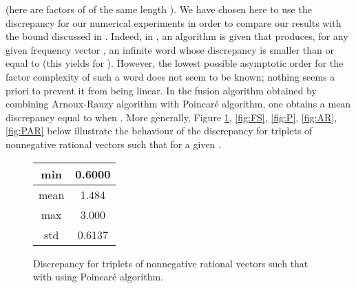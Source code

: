 \documentclass[preliminary,copyright,creativecommons]{eptcs}
\begin{document}
(here  are     factors   of  of the same length ).  We have chosen here to use the discrepancy for our  numerical experiments in order
to compare our results with the  bound  discussed  in  \cite{tij}.
Indeed, in   \cite{tij},   an  algorithm   is given that produces, for any given  frequency vector ,   an infinite word   whose
 discrepancy   is smaller than or equal to  (this yields  for ). However,   the  lowest possible   asymptotic order  for the  factor complexity of   such a  word     does not seem to be   known; nothing seems  a priori to prevent it  from  being linear.  In the fusion algorithm obtained  by combining Arnoux-Rauzy algorithm with Poincar\'e algorithm,
 one obtains   a mean  discrepancy   equal to  when . More generally, Figure  \ref{fig:P20}, \ref{fig:FS},  \ref{fig:P}, \ref{fig:AR}, \ref{fig:PAR} below  illustrate  the behaviour  of the discrepancy 
for   triplets of nonnegative rational  vectors    such that   for a  given .


\begin{center}
\begin{figure}[ht!]
\begin{minipage}[c]{0.2\linewidth}
\begin{tabular}{c|c}
min & 0.6000 \\
\hline
mean & 1.484 \\
\hline
max & 3.000 \\
\hline
std & 0.6137 \\
\end{tabular}
 \end{minipage}
\begin{minipage}[c]{0.8\linewidth}
\end{minipage}
 \caption{Discrepancy for triplets of nonnegative rational  vectors    such that  with  using Poincar\'e algorithm.}
\label{fig:P20}
\end{figure}
\end{center}
\end{document}
